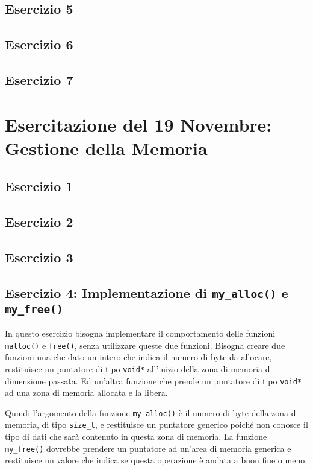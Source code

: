 \documentclass{article}
\numberwithin{equation}{subsection}
\begin{document}
\subsection{Esercizio 5}
\subsection{Esercizio 6}
\subsection{Esercizio 7}

\clearpage

\section{Esercitazione del 19 Novembre: Gestione della Memoria}

\subsection{Esercizio 1}
\subsection{Esercizio 2}
\subsection{Esercizio 3}
\subsection{Esercizio 4: Implementazione di \texttt{my\_alloc()} e \texttt{my\_free()}}

In questo esercizio bisogna implementare il comportamento delle funzioni \verb|malloc()| e \verb|free()|, 
senza utilizzare queste due funzioni. Bisogna creare due funzioni una che dato un intero che indica il numero di byte 
da allocare, restituisce un puntatore di tipo \verb|void*| all'inizio della zona di memoria di dimensione passata. Ed un'altra funzione 
che prende un puntatore di tipo \verb|void*| ad una zona di memoria allocata e la libera. 

Quindi l'argomento della funzione \verb|my_alloc()| è il numero di byte della zona di memoria, di tipo \verb|size_t|, e 
restituisce un puntatore generico poiché non conosce il tipo di dati che sarà contenuto in questa 
zona di memoria. La funzione \verb|my_free()| dovrebbe prendere un puntatore ad un'area di memoria 
generica e restituisce un valore che indica se questa operazione è andata a buon fine o meno. 
\end{document}
